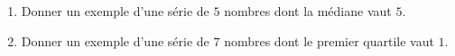 
\begin{exercice}\label{exoSeconde-0073}

    \begin{enumerate}
        \item
            Donner un exemple d'une série de \( 5\) nombres dont la médiane vaut \( 5\).
        \item
            Donner un exemple d'une série de \( 7\) nombres dont le premier quartile vaut \( 1\).
    \end{enumerate}

\end{exercice}

